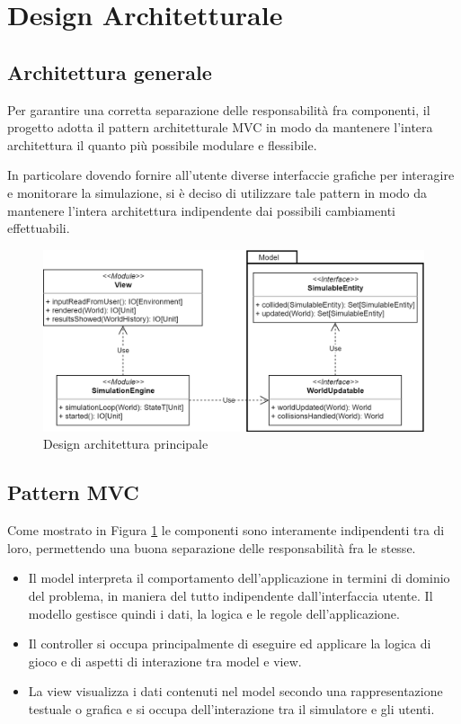 \section{Design Architetturale}

\subsection{Architettura generale}

Per garantire una corretta separazione delle responsabilità fra componenti, il progetto adotta il pattern architetturale MVC in modo da mantenere l’intera architettura il quanto più possibile modulare e flessibile.

In particolare dovendo fornire all'utente diverse interfaccie grafiche per interagire e monitorare la simulazione, si è deciso di utilizzare tale pattern in modo da mantenere l’intera architettura indipendente dai possibili cambiamenti effettuabili.

\begin{figure}[h!]
\centering
\includegraphics[width=\textwidth, scale=0.44]{img/MainArchitecture.png}
\caption{Design architettura principale}
\label{fig:mainarchitecture}
\end{figure}

\subsection{Pattern MVC}
Come mostrato in Figura \ref{fig:mainarchitecture} le componenti sono interamente indipendenti tra di loro, permettendo una buona separazione delle responsabilità fra le stesse.

\begin{itemize}
    \item Il model interpreta il comportamento dell’applicazione in termini di dominio del problema, in maniera del tutto indipendente dall’interfaccia utente. Il modello gestisce quindi i dati, la logica e le regole dell’applicazione.
    \item Il controller si occupa principalmente di eseguire ed applicare la logica di gioco e di aspetti di interazione tra model e view.
    \item La view visualizza i dati contenuti nel model secondo una rappresentazione testuale o grafica e si occupa dell'interazione tra il simulatore e gli utenti.
\end{itemize}

